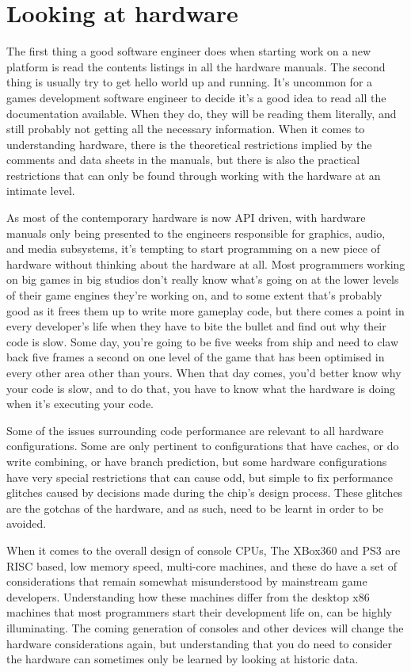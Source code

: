 \chapter[Hardware]{Looking at hardware}

The first thing a good software engineer does when starting work on a new
platform is read the contents listings in all the hardware manuals. The second
thing is usually try to get hello world up and running. It's uncommon for a
games development software engineer to decide it's a good idea to read all the
documentation available. When they do, they will be reading them literally, and
still probably not getting all the necessary information. When it comes to
understanding hardware, there is the theoretical restrictions implied by the
comments and data sheets in the manuals, but there is also the practical
restrictions that can only be found through working with the hardware at an
intimate level.

As most of the contemporary hardware is now API driven, with hardware manuals
only being presented to the engineers responsible for graphics, audio, and
media subsystems, it's tempting to start programming on a new piece of hardware
without thinking about the hardware at all. Most programmers working on big
games in big studios don't really know what's going on at the lower levels of
their game engines they're working on, and to some extent that's probably good
as it frees them up to write more gameplay code, but there comes a point in
every developer's life when they have to bite the bullet and find out why their
code is slow. Some day, you're going to be five weeks from ship and need to
claw back five frames a second on one level of the game that has been optimised
in every other area other than yours. When that day comes, you'd better know
why your code is slow, and to do that, you have to know what the hardware is
doing when it's executing your code.

Some of the issues surrounding code performance are relevant to all hardware
configurations. Some are only pertinent to configurations that have caches, or
do write combining, or have branch prediction, but some hardware configurations
have very special restrictions that can cause odd, but simple to fix
performance glitches caused by decisions made during the chip's design process.
These glitches are the gotchas of the hardware, and as such, need to be learnt
in order to be avoided.

When it comes to the overall design of console CPUs, The XBox360 and PS3 are
RISC based, low memory speed, multi-core machines, and these do have a set of
considerations that remain somewhat misunderstood by mainstream game
developers. Understanding how these machines differ from the desktop x86
machines that most programmers start their development life on, can be highly
illuminating. The coming generation of consoles and other devices will change
the hardware considerations again, but understanding that you do need to
consider the hardware can sometimes only be learned by looking at historic
data.

